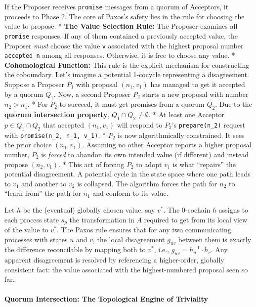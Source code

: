 \documentclass[
]{article}
\begin{document}
If the Proposer receives \texttt{promise} messages from a quorum of
Acceptors, it proceeds to Phase 2. The core of Paxos's safety lies in
the rule for choosing the value to propose. * \textbf{The Value
Selection Rule:} The Proposer examines all \texttt{promise} responses.
If any of them contained a previously accepted value, the Proposer
\emph{must} choose the value \texttt{v} associated with the highest
proposal number \texttt{accepted\_n} among all responses. Otherwise, it
is free to choose any value. * \textbf{Cohomological Function:} This
rule is the explicit mechanism for constructing the coboundary. Let's
imagine a potential 1-cocycle representing a disagreement. Suppose a
Proposer \(P_1\) with proposal \((n_1, v_1)\) has managed to get it
accepted by a quorum \(Q_1\). Now, a second Proposer \(P_2\) starts a
new proposal with number \(n_2 > n_1\). * For \(P_2\) to succeed, it
must get promises from a quorum \(Q_2\). Due to the \textbf{quorum
intersection property}, \(Q_1 \cap Q_2 \neq \emptyset\). * At least one
Acceptor \(p \in Q_1 \cap Q_2\) that accepted \((n_1, v_1)\) will
respond to \(P_2\)'s \texttt{prepare(n\_2)} request with
\texttt{promise(n\_2,\ n\_1,\ v\_1)}. * \(P_2\) is now algorithmically
constrained. It sees the prior choice \((n_1, v_1)\). Assuming no other
Acceptor reports a higher proposal number, \(P_2\) is \emph{forced} to
abandon its own intended value (if different) and instead propose
\((n_2, v_1)\). * This act of forcing \(P_2\) to adopt \(v_1\) is what
``repairs'' the potential disagreement. A potential cycle in the state
space where one path leads to \(v_1\) and another to \(v_2\) is
collapsed. The algorithm forces the path for \(n_2\) to ``learn from''
the path for \(n_1\) and conform to its value.

Let \(h\) be the (eventual) globally chosen value, say \(v^*\). The
0-cochain \(h\) assigns to each process state \(s_p\) the transformation
in \(A\) required to get from its local view of the value to \(v^*\).
The Paxos rule ensures that for any two communicating processes with
states \(u\) and \(v\), the local disagreement \(g_{uv}\) between them
is exactly the difference reconcilable by mapping both to \(v^*\), i.e.,
\(g_{uv} = h_u^{-1} \cdot h_v\). Any apparent disagreement is resolved
by referencing a higher-order, globally consistent fact: the value
associated with the highest-numbered proposal seen so far.

\paragraph{Quorum Intersection: The Topological Engine of
Triviality}\label{quorum-intersection-the-topological-engine-of-triviality}
\end{document}
